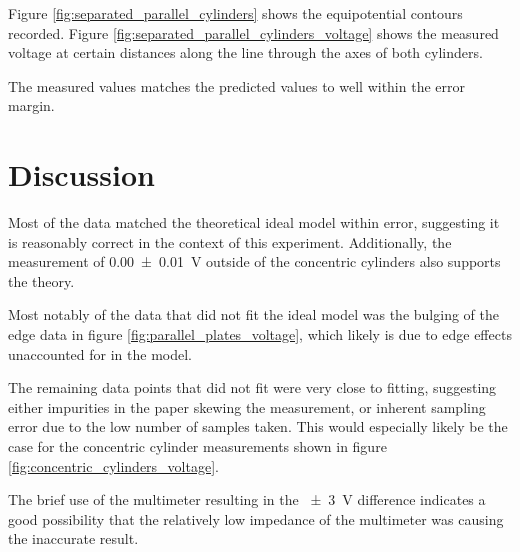 \documentclass[a4paper]{scrartcl}
\begin{document}
Figure \ref{fig:separated_parallel_cylinders} shows the equipotential contours recorded. Figure \ref{fig:separated_parallel_cylinders_voltage} shows the measured voltage at certain distances along the line through the axes of both cylinders.

The measured values matches the predicted values to well within the error margin.

\section{Discussion}
Most of the data matched the theoretical ideal model within error, suggesting it is reasonably correct in the context of this experiment. Additionally, the measurement of \SI{0.00 \pm 0.01}{\volt} outside of the concentric cylinders also supports the theory.

Most notably of the data that did not fit the ideal model was the bulging of the edge data in figure \ref{fig:parallel_plates_voltage}, which likely is due to edge effects unaccounted for in the model.

The remaining data points that did not fit were very close to fitting, suggesting either impurities in the paper skewing the measurement, or inherent sampling error due to the low number of samples taken. This would especially likely be the case for the concentric cylinder measurements shown in figure \ref{fig:concentric_cylinders_voltage}.

The brief use of the multimeter resulting in the \SI{\pm 3}{\volt} difference indicates a good possibility that the relatively low impedance of the multimeter was causing the inaccurate result.
\end{document}
